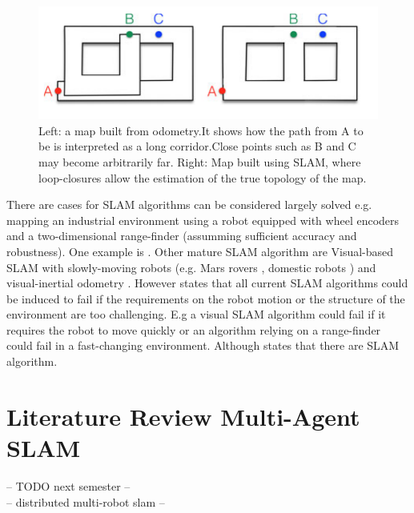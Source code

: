 \begin{figure}[H]
\includegraphics[scale=0.55]{Figures/infinite_corridor.png}
\centering
\caption{Left: a map built from odometry.It shows how the path from A to be is interpreted as a long corridor.Close points such as B and C may become arbitrarily far. Right: Map built using SLAM, where loop-closures allow the estimation of the true topology of the map. }
\label{figure:infinite_corridor}
\end{figure}

There are cases for SLAM algorithms can be considered largely solved  e.g. mapping an industrial environment using a robot equipped with wheel encoders and a two-dimensional range-finder (assumming sufficient accuracy and robustness). One example is \cite{roboticskuka}.
Other mature SLAM algorithm are Visual-based SLAM with slowly-moving robots (e.g. Mars rovers \cite{maimone2007two}, domestic robots \cite{ackerman2014dyson}) and visual-inertial odometry \cite{lynen2015get}.
\noindent However \cite{cadena2016past} states that all current SLAM algorithms could be induced to fail if the requirements on the robot motion or the structure of the environment are too challenging. E.g a visual SLAM algorithm could fail if it requires the robot to move quickly or an algorithm relying on a range-finder could fail in a fast-changing environment.
Although  states that there are SLAM algorithm.

\section{Literature Review Multi-Agent SLAM}
\label{section:litreview_slam}

-- TODO next semester --\\
-- distributed multi-robot slam --